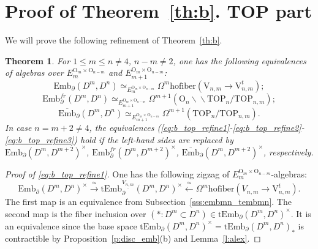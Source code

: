 \documentclass[11pt]{amsart}
\newtheorem{theorem}{Theorem}[section]
\theoremstyle{definition}
\newcommand{\Embmn}{\mathrm{Emb}_\partial(D^m,D^n)}
\newcommand{\tEmbmn}{\mathrm{tEmb}_\partial(D^m,D^n)}
\newcommand{\Ebar}{\overline{\mathrm{Emb}}}
\newcommand{\Emb}{\mathrm{Emb}}
\newcommand{\tEmb}{\mathrm{tEmb}}
\newcommand{\TOP}{\mathrm{TOP}}
\newcommand{\OO}{\mathrm{O}}
\newcommand{\VV}{\mathrm{V}}
\newcommand{\hofiber}{\mathrm{hofiber}}
\newcommand{\bbslash}{\backslash\!\!\backslash}
\numberwithin{equation}{section}
\begin{document}
\section{Proof of Theorem~\ref{th:b}. TOP part}\label{s:proof_B_TOP}
We will prove the following refinement of Theorem~\ref{th:b}.

\begin{theorem}\label{th:b_top_refine}
For $1\leq m\leq n\neq 4$, $n-m\neq 2$, one has the following equivalences of algebras over $E_m^{\OO_m\times\OO_{n-m}}$ and
$E_{m+1}^{\OO_m\times\OO_{n-m}}$:
\begin{equation}\label{eq:b_top_refine1}
\Emb_\partial(D^m,D^n)\simeq _{E_m^{\OO_m\times\OO_{n-m}}}\Omega^m\hofiber\left(\VV_{n,m}\to\VV_{n,m}^t\right);
\end{equation}
\begin{equation}\label{eq:b_top_refine2}
\Emb^{fr}_\partial(D^m,D^n)\simeq _{E_{m+1}^{\OO_m\times\OO_{n-m}}}\Omega^{m+1}\left(\OO_n\bbslash\TOP_n/
\TOP_{n,m}\right);
\end{equation}
\begin{equation}\label{eq:b_top_refine3}
\Ebar_\partial(D^m,D^n)\simeq _{E_{m+1}^{\OO_m\times\OO_{n-m}}}\Omega^{m+1}\left(\TOP_n/
\TOP_{n,m}\right).
\end{equation}
In case $n=m+2\neq 4$, the equivalences (\ref{eq:b_top_refine1}-\ref{eq:b_top_refine2}-\ref{eq:b_top_refine3}) %
 hold if the left-hand sides are replaced by
$\Emb_\partial(D^m,D^{m+2})^\times$, $\Emb^{fr}_\partial(D^m,D^{m+2})^\times$, $\Ebar_\partial(D^m,D^{m+2})^\times$, respectively.
\end{theorem}


\begin{proof}[Proof of \eqref{eq:b_top_refine1}]
One has the following zigzag of $E_m^{\OO_m\times\OO_{n-m}}$-algebras:
\begin{equation}\label{eq:zigzag_refine1}
\Embmn^\times\xrightarrow{\,\simeq\,}\tEmb_\partial^{\underline{V_{n,m}}}(D^m,D^n)^\times\xleftarrow{\,\simeq\,}
\Omega^m\hofiber(V_{n,m}\to \VV_{n,m}^t).
\end{equation}
The first map is an equivalence from Subsection~\ref{sss:embmn_tembmn}. The second map is the fiber inclusion over 
$(*\colon D^m\subset D^n)\in \tEmbmn^\times$. It is an equivalence since the base space $\tEmbmn^\times=\tEmbmn_*$
is contractible by Proposition~\ref{p:disc_emb}(b) and Lemma~\ref{l:alex}.
\end{proof}
\end{document}
